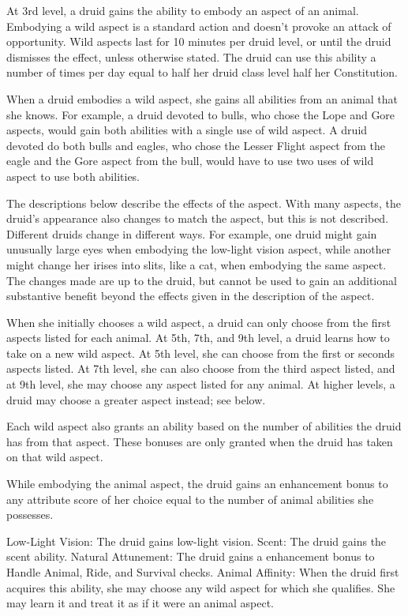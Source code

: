   At 3rd level, a druid gains the ability to embody an aspect of an animal. Embodying a wild aspect is a standard action and doesn't provoke an attack of opportunity. Wild aspects last for 10 minutes per druid level, or until the druid dismisses the effect, unless otherwise stated. The druid can use this ability a number of times per day equal to half her druid class level \add half her Constitution.
\par When a druid embodies a wild aspect, she gains all abilities from an animal that she knows. For example, a druid devoted to bulls, who chose the Lope and Gore aspects, would gain both abilities with a single use of wild aspect. A druid devoted do both bulls and eagles, who chose the Lesser Flight aspect from the eagle and the Gore aspect from the bull, would have to use two uses of wild aspect to use both abilities.
\par The descriptions below describe the effects of the aspect. With many aspects, the druid's appearance also changes to match the aspect, but this is not described. Different druids change in different ways. For example, one druid might gain unusually large eyes when embodying the low-light vision aspect, while another might change her irises into slits, like a cat, when embodying the same aspect. The changes made are up to the druid, but cannot be used to gain an additional substantive benefit beyond the effects given in the description of the aspect.
\par When she initially chooses a wild aspect, a druid can only choose from the first aspects listed for each animal. At 5th, 7th, and 9th level, a druid learns how to take on a new wild aspect. At 5th level, she can choose from the first or seconds aspects listed. At 7th level, she can also choose from the third aspect listed, and at 9th level, she may choose any aspect listed for any animal. At higher levels, a druid may choose a greater aspect instead; see below.
\par Each wild aspect also grants an ability based on the number of abilities the druid has from that aspect. These bonuses are only granted when the druid has taken on that wild aspect.

While embodying the animal aspect, the druid gains an enhancement bonus to any attribute score of her choice equal to the number of animal abilities she possesses.
\begin{wildaspect}
\wilditem Low-Light Vision: The druid gains low-light vision.
\wilditem Scent: The druid gains the scent ability.
\wilditem Natural Attunement: The druid gains a  enhancement bonus to Handle Animal, Ride, and Survival checks.
\wilditem Animal Affinity: When the druid first acquires this ability, she may choose any wild aspect for which she qualifies. She may learn it and treat it as if it were an animal aspect.
\end{wildaspect}

